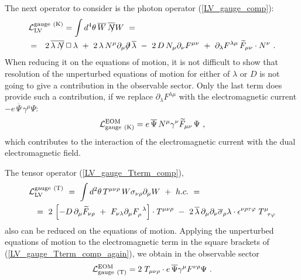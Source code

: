 \documentclass[12pt]{revtex4}
\newcommand{\slashed}[1]{\hbox{{$#1$}\llap{$/$}}}
\begin{document}
The next operator to consider is the photon operator
(\ref{LV_gauge_comp}):
\begin{eqnarray}
\label{LV_gauge_comp_again}
\lefteqn{
\mathcal{L}_{\mathrm{LV}}^{\mathrm{gauge\ (K)}} =  
\int d^4\theta \, \overline{W}\, \overline{\slashed{N}}W ~=~
} \\
\nonumber
& = &
2\, \overline{\lambda\,\slashed{N}}\, \Box\, 
   \lambda 
~+~
2\, \lambda\, N^\mu \partial_\mu \slashed{\partial}\, 
   \overline{\lambda} 
~-~ 
2\, D\, N_\mu \partial_\nu F^{\mu\nu}
~+~ 
\partial_\lambda F^{\lambda\mu}\, 
\widetilde{F}_{\mu\nu} \cdot N^\nu
~.
\end{eqnarray}
When reducing it on the equations of motion,
        it is not difficult to show that resolution of the 
unperturbed equations of motion for either of 
$ \lambda $ or $ D $ is not going to give a contribution
in the observable sector.
Only the last term does provide such a contribution,
if we replace 
$ \partial_\lambda F^{\lambda\mu} $ 
with the electromagnetic current 
$ - e\, \overline{\Psi}\, \gamma^\mu \Psi $:
\begin{equation}
\label{LV_induced_by_gauge_K}
        \mathcal{L}_{\rm gauge\ (K)}^{\rm EOM} = 
 e\, \overline{\Psi}\, N^\mu \gamma^\nu
\widetilde{F}_{\mu\nu}\, \Psi~,
\end{equation}
        which contributes to the interaction of the electromagnetic
current with the dual electromagnetic field. 

The tensor operator (\ref{LV_gauge_Tterm_comp}),
\begin{eqnarray}
\nonumber
\lefteqn{
\mathcal{L}_{\mathrm{LV}}^{\mathrm{gauge\ (T)}}  ~=~ 
\int d^2\theta \, T^{\mu\nu\rho} \,
        W \sigma_{\nu\rho} \partial_\mu W  ~+~ h.c. ~=~ } \\
\label{LV_gauge_Tterm_comp_again}
        &&
        =~
2\,
\left[
   - D\, \partial_\mu \widetilde{F}_{\nu\rho} 
   ~+~
   F_{\nu\lambda}\partial_\mu F_\rho^{\phantom{\rho}\lambda}
\right] 
\cdot
	T^{\mu\nu\rho}
	~-~
	2\,
    	\overline{\lambda}\, \partial_\mu \partial_\nu
    	\overline{\sigma}_\rho \lambda
	\cdot
   	\epsilon^{\nu\rho\tau\varphi}
	\;
   	T^\mu_{\phantom{\mu}\tau\varphi}
\end{eqnarray}
        also can be reduced on the equations of motion.
Applying the unperturbed equations of motion to the 
electromagnetic term in the square brackets of 
(\ref{LV_gauge_Tterm_comp_again}), we obtain in the
observable sector
\begin{eqnarray}
        \mathcal{L}_{\rm gauge\ (T)}^{\rm EOM} =  
\label{LV_induced_by_gauge_T}
	2\; T_{\mu\nu\rho} \cdot 
	e\, \overline{\Psi} \gamma^\mu F^{\nu\rho} \Psi
	~.
\end{eqnarray}
\end{document}
